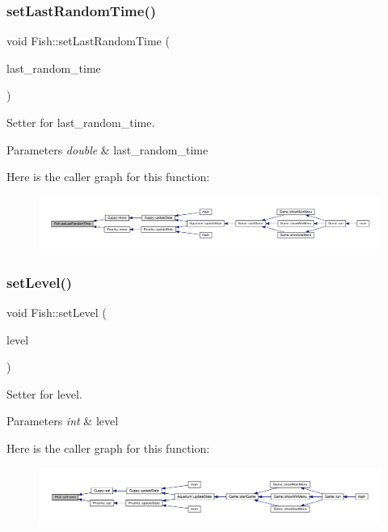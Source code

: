 \subsubsection{\texorpdfstring{set\+Last\+Random\+Time()}{setLastRandomTime()}}
{\footnotesize\ttfamily void Fish\+::set\+Last\+Random\+Time (\begin{DoxyParamCaption}\item[{double}]{last\+\_\+random\+\_\+time }\end{DoxyParamCaption})}



Setter for last\+\_\+random\+\_\+time. 


\begin{DoxyParams}{Parameters}
{\em double} & last\+\_\+random\+\_\+time \\
\hline
\end{DoxyParams}
Here is the caller graph for this function\+:
\nopagebreak
\begin{figure}[H]
\begin{center}
\leavevmode
\includegraphics[width=350pt]{class_fish_a883d6bd47ac65d319269eee4c46cf461_icgraph}
\end{center}
\end{figure}
\mbox{\label{class_fish_aee737597ff02a50486c6e2096ccc220d}} 
\subsubsection{\texorpdfstring{set\+Level()}{setLevel()}}
{\footnotesize\ttfamily void Fish\+::set\+Level (\begin{DoxyParamCaption}\item[{int}]{level }\end{DoxyParamCaption})}



Setter for level. 


\begin{DoxyParams}{Parameters}
{\em int} & level \\
\hline
\end{DoxyParams}
Here is the caller graph for this function\+:
\nopagebreak
\begin{figure}[H]
\begin{center}
\leavevmode
\includegraphics[width=350pt]{class_fish_aee737597ff02a50486c6e2096ccc220d_icgraph}
\end{center}
\end{figure}



